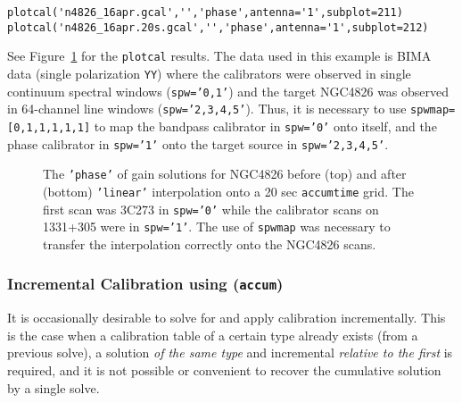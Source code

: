 {\begin{verbatim}
plotcal('n4826_16apr.gcal','','phase',antenna='1',subplot=211)
plotcal('n4826_16apr.20s.gcal','','phase',antenna='1',subplot=212)
\end{verbatim}
\normalsize
See Figure~\ref{fig:accum_interp} for the {\tt plotcal} results.
The data used in this example is BIMA data (single polarization 
{\tt  YY}) where the calibrators were observed in single continuum
spectral windows ({\tt spw='0,1'}) and the target NGC4826 was observed
in 64-channel line windows ({\tt spw='2,3,4,5'}).  Thus, it is 
necessary to use {\tt spwmap=[0,1,1,1,1,1]} to map the bandpass
calibrator in {\tt spw='0'} onto itself, and the phase calibrator 
in {\tt spw='1'} onto the target source in {\tt spw='2,3,4,5'}.

\begin{figure}[h!]
\begin{center}
\caption{\label{fig:accum_interp} The {\tt 'phase'} of gain solutions
for NGC4826 before (top) and after (bottom) {\tt 'linear'} interpolation onto
a 20 sec {\tt accumtime} grid.  The first scan was 3C273 in {\tt spw='0'} 
while the calibrator scans on 1331+305 were in {\tt spw='1'}.  The use of 
{\tt spwmap} was necessary to transfer the interpolation correctly
onto the NGC4826 scans.
}
\hrulefill
\end{center}
\end{figure}



\subsubsection{Incremental Calibration using ({\tt accum})}
\label{section:cal.tables.accum.incr}

It is occasionally desirable to solve for and apply calibration
incrementally.  This is the case when a calibration table of a certain
type already exists (from a previous solve), a solution {\it of the
same type} and incremental {\it relative to the first} is required,
and it is not possible or convenient to recover the cumulative
solution by a single solve.

}
